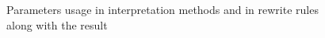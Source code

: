 \begin{figure}[h!]
	\subfloat{
		\usebox{\lstBox}
	} \hfill
	\caption{Parameters usage in \lsystem interpretation methods and in rewrite rules along with the result}
	\label{fig:scExample}
\end{figure}




































